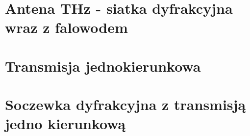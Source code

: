 

\section{Antena THz - siatka dyfrakcyjna wraz z falowodem}


\section{Transmisja jednokierunkowa}

\section{Soczewka dyfrakcyjna z transmisją jedno kierunkową}
